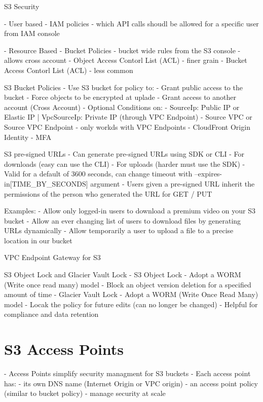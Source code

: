 \documentclass[11pt]{book}
\begin{document}
    S3 Security

    - User based
        - IAM policies - which API calls shoudl be allowed for a specific user from IAM console

    - Resource Based
        - Bucket Policies - bucket wide rules from the S3 console - allows cross account
        - Object Access Contorl List (ACL) - finer grain
        - Bucket Access Contorl List (ACL) - less common

    S3 Bucket Policies
    - Use S3 bucket for policy to:
        - Grant public access to the bucket
        - Force objects to be encrypted at uplade
        - Grant access to another account (Cross Account)
    - Optional Conditions on:
        - SourceIp: Public IP or Elastic IP | VpcSourceIp: Private IP (through VPC Endpoint)
        - Source VPC or Source VPC Endpoint - only workds with VPC Endpoints
        - CloudFront Origin Identity
        - MFA

    S3 pre-signed URLs
    - Can generate pre-signed URLs using SDK or CLI
        - For downloads (easy can use the CLI)
        - For uploads (harder must use the SDK)
    - Valid for a default of 3600 seconds, can change timeout with --expires-in[TIME_BY_SECONDS] argument
    - Users given a pre-signed URL inherit the permissions of the person who generated the URL for GET / PUT

    Examples:
        - Allow only logged-in users to download a premium video on your S3 bucket
        - Allow an ever changing list of users to download files by generating URLs dynamically
        - Allow temporarily a user to upload a file to a precise location in our bucket

    VPC Endpoint Gateway for S3

    S3 Object Lock and Glacier Vault Lock
    - S3 Object Lock
        - Adopt a WORM (Write once read many) model
        - Block an object version deletion for a specified amount of time
    - Glacier Vault Lock
        - Adopt a WORM (Write Once Read Many) model
        - Locak the policy for future edits (can no longer be changed)
        - Helpful for compliance and data retention

    \section{S3 Access Points}
    - Access Points simplify security managment for S3 buckets
    - Each access point has:
        - its own DNS name (Internet Origin or VPC origin)
        - an access point policy (similar to bucket policy) - manage security at scale
\end{document}
